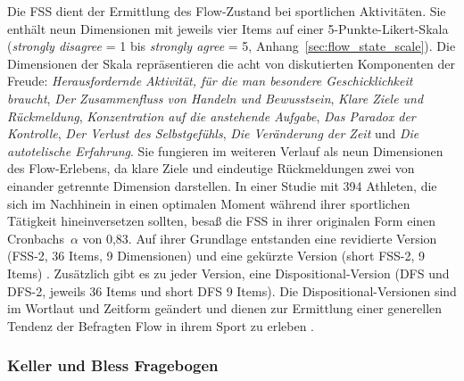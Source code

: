 Die \ac{FSS} dient der Ermittlung des Flow-Zustand bei sportlichen Aktivitäten. Sie enthält neun Dimensionen mit jeweils vier Items auf einer 5-Punkte-Likert-Skala (\emph{strongly disagree} = 1 bis \emph{strongly agree} = 5, Anhang~\ref{sec:flow_state_scale}). Die Dimensionen der Skala repräsentieren die acht von \citet[S. 73-101]{Csikszentmihalyi1992} diskutierten Komponenten der Freude: \emph{Herausfordernde Aktivität, für die man besondere Geschicklichkeit braucht}, \emph{Der Zusammenfluss von Handeln und Bewusstsein}, \emph{Klare Ziele und Rückmeldung}, \emph{Konzentration auf die anstehende Aufgabe}, \emph{Das Paradox der Kontrolle}, \emph{Der Verlust des Selbstgefühls}, \emph{Die Veränderung der Zeit} und \emph{Die autotelische Erfahrung}. Sie fungieren im weiteren Verlauf als neun Dimensionen des Flow-Erlebens, da klare Ziele und eindeutige Rückmeldungen zwei von einander getrennte Dimension darstellen. In einer Studie mit 394 Athleten, die sich im Nachhinein in einen optimalen Moment während ihrer sportlichen Tätigkeit hineinversetzen sollten, besaß die \ac{FSS} in ihrer originalen Form einen Cronbachs~$\alpha$ von 0,83. Auf ihrer Grundlage entstanden eine revidierte Version (FSS-2, 36 Items, 9 Dimensionen) und eine gekürzte Version (short FSS-2, 9 Items) \citep[][]{Jackson2002, Jackson2008}. Zusätzlich gibt es zu jeder Version, eine Dispositional-Version (\acs{DFS} und DFS-2, jeweils 36 Items und short DFS 9 Items). Die Dispositional-Versionen sind im Wortlaut und Zeitform geändert und dienen zur Ermittlung einer generellen Tendenz der Befragten Flow in ihrem Sport zu erleben \citep[][S.~356]{Jackson1998}.


\subsubsection{Keller und Bless Fragebogen} %
\label{ssub:keller_und_bless_fragebogen}

